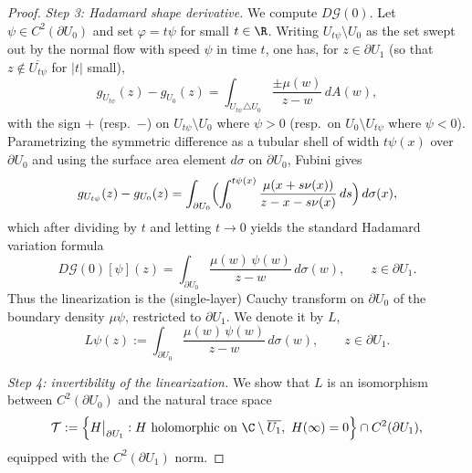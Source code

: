 \begin{proof}
\medskip
\noindent\emph{Step 3: Hadamard shape derivative.}
We compute \(D\mathcal{G}(0)\). Let \(\psi\in C^2(\partial U_0)\) and set
\(\varphi=t\psi\) for small \(t\in \R\). Writing
\(U_{t\psi}\setminus U_0\) as the set swept out by the normal flow with
speed \(\psi\) in time \(t\), one has, for \(z\in \partial U_1\) (so that
\(z\notin \overline{U_{t\psi}}\) for \(|t|\) small),
\[
g_{U_{t\psi}}(z)-g_{U_0}(z)
=
\int_{U_{t\psi}\triangle U_0}\frac{\pm \mu(w)}{z-w}\,dA(w),
\]
with the sign \(+\) (resp.\ \(-\)) on \(U_{t\psi}\setminus U_0\) where
\(\psi>0\) (resp.\ on \(U_0\setminus U_{t\psi}\) where \(\psi<0\)).
Parametrizing the symmetric difference as a tubular shell of width
\(t\psi(x)\) over \(\partial U_0\) and using the surface area element
\(d\sigma\) on \(\partial U_0\), Fubini gives
\[
g_{U_{t\psi}}(z)-g_{U_0}(z)
=
\int_{\partial U_0}
\Bigl(\int_0^{t\psi(x)}\frac{\mu(x+s\nu(x))}{z-x-s\nu(x)}\,ds\Bigr)\,d\sigma(x),
\]
which after dividing by \(t\) and letting \(t\to 0\) yields the standard
Hadamard variation formula
\begin{equation}\label{eq:appendix-shape-derivative-cauchy}
D\mathcal{G}(0)[\psi](z)
=
\int_{\partial U_0}
\frac{\mu(w)\,\psi(w)}{z-w}\,d\sigma(w),
\qquad z\in \partial U_1.
\end{equation}
Thus the linearization is the (single-layer) Cauchy transform on
\(\partial U_0\) of the boundary density \(\mu\psi\), restricted to
\(\partial U_1\). We denote it by \(L\),
\[
L\psi(z):=\int_{\partial U_0}\frac{\mu(w)\,\psi(w)}{z-w}\,d\sigma(w),
\qquad z\in \partial U_1.
\]

\medskip
\noindent\emph{Step 4: invertibility of the linearization.}
We show that \(L\) is an isomorphism between \(C^2(\partial U_0)\) and the
natural trace space
\[
\mathcal{T}:=\Bigl\{H\big|_{\partial U_1}:H\text{ holomorphic on }
\C\setminus \overline{U_1},\ H(\infty)=0\Bigr\}\cap C^2(\partial U_1),
\]
equipped with the \(C^2(\partial U_1)\) norm.


\end{proof}
